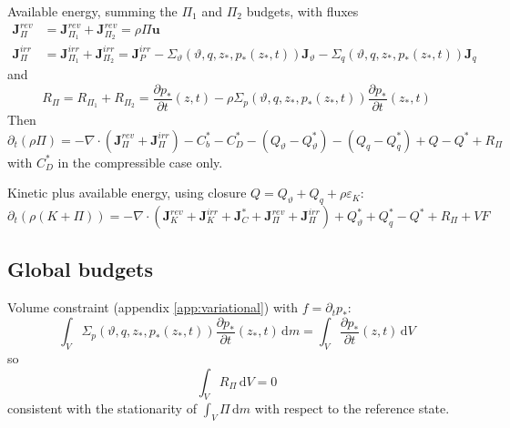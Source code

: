 \documentclass{article}
\begin{document}
Available energy, summing the \(\Pi_1\) and \(\Pi_2\) budgets, with fluxes
\begin{align}
    \mathbf{J}_\Pi^{rev}
    & =
    \mathbf{J}_{\Pi_1}^{rev} + \mathbf{J}_{\Pi_2}^{rev}
    =
    \rho \Pi \mathbf{u}
    \\
    \mathbf{J}_\Pi^{irr}
    & =
    \mathbf{J}_{\Pi_1}^{irr} + \mathbf{J}_{\Pi_2}^{irr}
    =
    \mathbf{J}_P^{irr}
    - \Sigma_\vartheta(\vartheta, q, z_*, p_*(z_*, t)) \mathbf{J}_\vartheta
    - \Sigma_q(\vartheta, q, z_*, p_*(z_*, t)) \mathbf{J}_q
\end{align}
and
\begin{equation}
    R_\Pi
    =
    R_{\Pi_1} + R_{\Pi_2}
    =
    \frac{\partial p_*}{\partial t}(z, t)
    - \rho \Sigma_p(\vartheta, q, z_*, p_*(z_*, t)) \frac{\partial p_*}{\partial t}(z_*, t)
\end{equation}
Then
\begin{equation}
    \partial_t (\rho \Pi)
    =
    - \nabla \cdot (
        \mathbf{J}_\Pi^{rev}
        + \mathbf{J}_\Pi^{irr}
        )
    - C_b^* - C_D^*
    - (Q_\vartheta - Q_\vartheta^*)
    - (Q_q - Q_q^*)
    + Q - Q^*
    + R_\Pi
\end{equation}
with \(C_D^*\) in the compressible case only.

Kinetic plus available energy, using closure \(Q = Q_\vartheta + Q_q + \rho \varepsilon_K\):
\begin{equation}
    \partial_t \left( \rho (K + \Pi) \right)
    =
    - \nabla \cdot (
        \mathbf{J}_K^{rev}
        + \mathbf{J}_K^{irr}
        + \mathbf{J}_C^*
        + \mathbf{J}_\Pi^{rev}
        + \mathbf{J}_\Pi^{irr}
        )
    + Q_\vartheta^* + Q_q^* - Q^*
    + R_\Pi
    + VF
\end{equation}

\subsection{Global budgets}
Volume constraint (appendix \ref{app:variational}) with \(f = \partial_t p_*\):
\begin{equation}
    \int_V \Sigma_p(\vartheta, q, z_*, p_*(z_*, t)) \frac{\partial p_*}{\partial t}(z_*, t) \, \mathrm{d}m
    =
    \int_V \frac{\partial p_*}{\partial t}(z, t) \, \mathrm{d}V
\end{equation}
so
\begin{equation}
    \int_V R_\Pi \, \mathrm{d}V = 0
\end{equation}
consistent with the stationarity of \(\int_V \Pi \, \mathrm{d}m\) with respect to the reference state.
\end{document}
